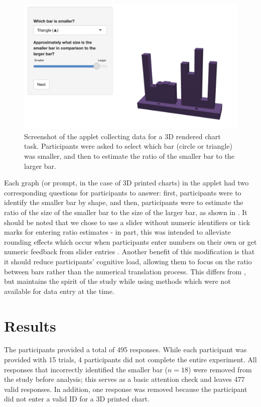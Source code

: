 \documentclass[letterpaper,inpress,dvipsnames]{jdsart}
\begin{document}
\begin{figure}
\includegraphics[width=0.8\linewidth]{_images/05-Experiment-05-filled-in} \caption{Screenshot of the applet collecting data for a 3D rendered chart task. Participants were asked to select which bar (circle or triangle) was smaller, and then to estimate the ratio of the smaller bar to the larger bar.}\label{fig:experiment3dRender}
\end{figure}

Each graph (or prompt, in the case of 3D printed charts) in the applet had two corresponding questions for participants to answer: first, participants were to identify the smaller bar by shape, and then, participants were to estimate the ratio of the size of the smaller bar to the size of the larger bar, as shown in .
It should be noted that we chose to use a slider without numeric identifiers or tick marks for entering ratio estimates - in part, this was intended to alleviate rounding effects which occur when participants enter numbers on their own or get numeric feedback from slider entries \citep{ruudUncertaintyCausesRounding2014a, maineriSliderBarsMultiDevice2021}.
Another benefit of this modification is that it should reduce participants' cognitive load, allowing them to focus on the ratio between bars rather than the numerical translation process.
This differs from \citet{clevelandGraphical1984}, but maintains the spirit of the study while using methods which were not available for data entry at the time.

\hypertarget{results}{%
\section{Results}\label{results}}

The participants provided a total of 495 responses.
While each participant was provided with 15 trials, 4 participants did not complete the entire experiment.
All responses that incorrectly identified the smaller bar (\(n = 18\)) were removed from the study before analysis; this serves as a basic attention check and leaves 477 valid responses.
In addition, one response was removed because the participant did not enter a valid ID for a 3D printed chart.
\end{document}
